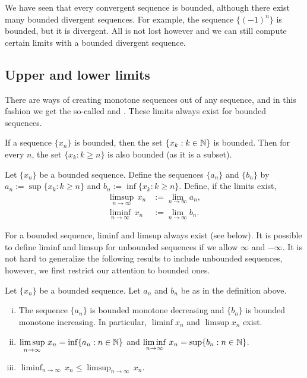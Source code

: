 We have seen that every convergent sequence is bounded,
although there exist many bounded divergent sequences.  For example,
the sequence $\{ {(-1)}^n \}$ is bounded,
but it is divergent.  All is not lost however and we can
still compute certain limits with a bounded divergent sequence.

\subsection{Upper and lower limits}

There are ways of creating monotone sequences out of any sequence, and
in this fashion we
get the so-called \emph{} and
\emph{}.  These limits always exist for bounded
sequences.

If a sequence $\{ x_n \}$ is bounded, then 
the set $\{ x_k : k \in {\mathbb{N}} \}$ is bounded.  Then for every $n$,
the set $\{ x_k : k \geq n \}$ is also bounded (as it is a subset).

\begin{defn} \label{liminflimsup:def}
Let $\{ x_n \}$ be a bounded sequence.  Define the sequences $\{ a_n \}$
and $\{ b_n \}$ by
$a_n := \sup \{ x_k : k \geq n \}$ and
$b_n := \inf \{ x_k : k \geq n \}$.  
Define, if the limits exist,
\begin{align*}
\limsup_{n \to \infty} \, x_n & := \lim_{n \to \infty} a_n ,
\\
\liminf_{n \to \infty} \, x_n & := \lim_{n \to \infty} b_n .
\end{align*}
\end{defn}

For a bounded sequence, liminf and limsup always exist (see below).  It is possible
to define liminf and limsup for unbounded sequences if we allow $\infty$
and $-\infty$.  It is not hard to generalize the following results to
include unbounded sequences, however, we first restrict our attention to
bounded ones.

\begin{prop}
Let $\{ x_n \}$ be a bounded sequence.  Let $a_n$ and $b_n$ be as in
the definition above.
\begin{enumerate}[(i)]
\item
The
sequence $\{ a_n \}$ is bounded monotone decreasing
and $\{ b_n \}$ is bounded monotone increasing.  In particular,
$\liminf x_n$ and $\limsup x_n$ exist.
\item
$\displaystyle \limsup_{n \to \infty} \, x_n = \inf \{ a_n : n \in {\mathbb{N}} \}$
and
$\displaystyle \liminf_{n \to \infty} \, x_n = \sup \{ b_n : n \in {\mathbb{N}} \}$.
\item
$\displaystyle \liminf_{n \to \infty} \, x_n \leq
\limsup_{n \to \infty} \, x_n$.
\end{enumerate}
\end{prop}

